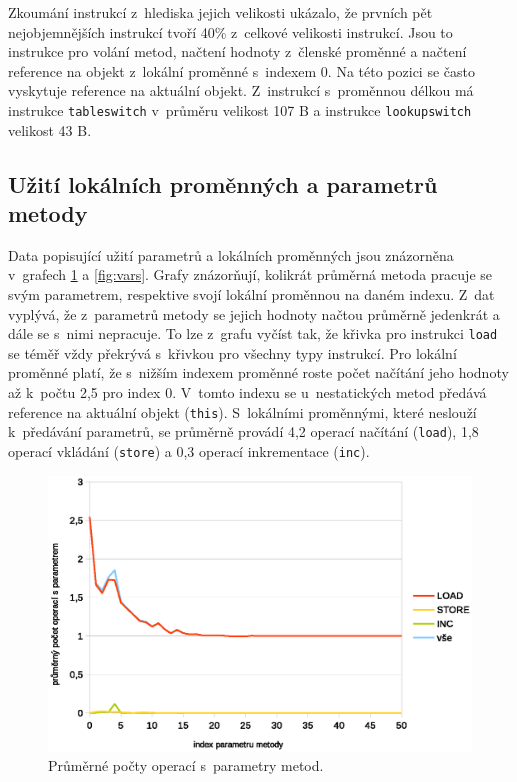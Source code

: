 Zkoumání instrukcí z~hlediska jejich velikosti ukázalo, že prvních pět nejobjemnějších instrukcí tvoří 40\% z~celkové velikosti instrukcí. Jsou to instrukce pro volání metod, načtení hodnoty z~členské proměnné a načtení reference na objekt z~lokální proměnné s~indexem 0. Na této pozici se často vyskytuje reference na aktuální objekt. Z~instrukcí s~proměnnou délkou má instrukce \texttt{tableswitch} v~průměru velikost 107 B a instrukce \texttt{lookupswitch} velikost 43 B.

\subsection{Užití lokálních proměnných a parametrů metody}

Data popisující užití parametrů a lokálních proměnných jsou znázorněna v~grafech \ref{fig:params} a \ref{fig:vars}. Grafy znázorňují, kolikrát průměrná metoda pracuje se svým parametrem, respektive svojí lokální proměnnou na daném indexu. 
Z~dat vyplývá, že z~parametrů metody se jejich hodnoty načtou průměrně jedenkrát a dále se s~nimi nepracuje. To lze z~grafu vyčíst tak, že křivka pro instrukci \texttt{load} se téměř vždy překrývá s~křivkou pro všechny typy instrukcí. Pro lokální proměnné platí, že s~nižším indexem proměnné roste počet načítání jeho hodnoty až k~počtu 2,5 pro index 0. V~tomto indexu se u~nestatických metod předává reference na aktuální objekt (\texttt{this}). S~lokálními proměnnými, které neslouží k~předávání parametrů, se průměrně provádí 4,2 operací načítání (\texttt{load}), 1,8 operací vkládání (\texttt{store}) a 0,3 operací inkrementace (\texttt{inc}).

\begin{figure}[h!]
\centering
\includegraphics[scale=0.9]{fig/params}
\caption{Průměrné počty operací s~parametry metod.}\label{fig:params}
\end{figure}

